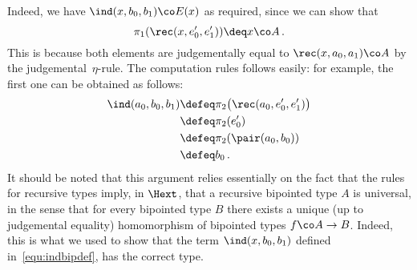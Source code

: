\begin{remark}
\begin{equation}
\end{equation}
Indeed, we have $\ind(x, b_0, b_1) \co E(x)$ as required, since we can show that
\[
\pi_1 ( \rec(x, e'_0, e'_1))  \deq x \co A \, .
\]
This is because both elements are judgementally equal to $\rec(x, a_0, a_1)  \co A$ by the
judgemental~$\eta$-rule. The computation rules follows easily: for example, the first one
can be obtained as follows:
\begin{align*} 
\ind(a_0, b_0, b_1)  & \defeq \pi_2 \big(  \rec(a_0, e'_0, e'_1) \big) \\
 & \defeq \pi_2 (e'_0) \\
 & \defeq \pi_2 (\pair(a_0, b_0)) \\
 & \defeq b_0 \, .
\end{align*}
It should be noted that this argument relies essentially on the fact that the rules for recursive types
imply, in $\Hext$, that a recursive bipointed type $A$ is universal, in the sense that for every bipointed 
type $B$ there exists a unique (up to judgemental equality) homomorphism of bipointed types $f \co A \to B$.
Indeed, this is what we used to show that the term $\ind(x, b_0, b_1)$ defined in~\eqref{equ:indbipdef}, has
the correct type.
\end{remark}

